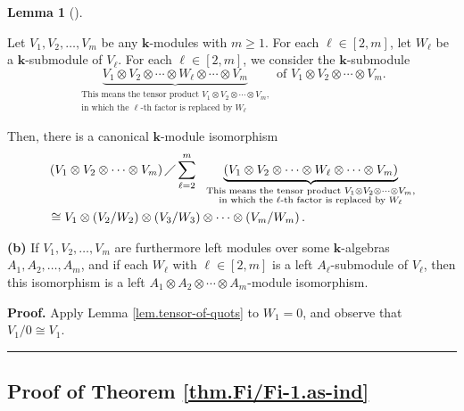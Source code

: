 \documentclass[numbers=enddot,12pt,final,onecolumn,notitlepage]{scrartcl}%
\theoremstyle{definition}
\newtheorem{lem}[theo]{Lemma}
\newenvironment{lemma}[1][]
{\begin{lem}[#1]\begin{leftbar}}
{\end{leftbar}\end{lem}}
\newenvironment{noncompile}{}{}
\newenvironment{proof}[1][Proof]{\noindent\textbf{#1.} }{\ \rule{0.5em}{0.5em}}
\let\sumnonlimits\sum
\renewcommand{\sum}{\sumnonlimits\limits}
\begin{document}
\begin{lemma}
\label{lem.tensor-of-quots2}Let $V_{1},V_{2},\ldots,V_{m}$ be any $\mathbf{k}%
$-modules with $m\geq1$. For each $\ell\in\left[  2,m\right]  $, let $W_{\ell
}$ be a $\mathbf{k}$-submodule of $V_{\ell}$. For each $\ell\in\left[
2,m\right]  $, we consider the $\mathbf{k}$-submodule
\[
\underbrace{V_{1}\otimes V_{2}\otimes\cdots\otimes W_{\ell}\otimes
\cdots\otimes V_{m}}_{\substack{\text{This means the tensor product }%
V_{1}\otimes V_{2}\otimes\cdots\otimes V_{m}\text{,}\\\text{in which the }%
\ell\text{-th factor is replaced by }W_{\ell}}}\text{ of }V_{1}\otimes
V_{2}\otimes\cdots\otimes V_{m}.
\]


Then, there is a canonical $\mathbf{k}$-module isomorphism%
\begin{align*}
&  \left(  V_{1}\otimes V_{2}\otimes\cdots\otimes V_{m}\right)  \diagup
\sum_{\ell=2}^{m}\ \ \underbrace{\left(  V_{1}\otimes V_{2}\otimes
\cdots\otimes W_{\ell}\otimes\cdots\otimes V_{m}\right)  }%
_{\substack{\text{This means the tensor product }V_{1}\otimes V_{2}%
\otimes\cdots\otimes V_{m}\text{,}\\\text{in which the }\ell\text{-th factor
is replaced by }W_{\ell}}}\\
&  \cong V_{1}\otimes\left(  V_{2}/W_{2}\right)  \otimes\left(  V_{3}%
/W_{3}\right)  \otimes\cdots\otimes\left(  V_{m}/W_{m}\right)  .
\end{align*}

\end{lemma}

\begin{noncompile}
\textbf{(b)} If $V_{1},V_{2},\ldots,V_{m}$ are furthermore left modules over
some $\mathbf{k}$-algebras $A_{1},A_{2},\ldots,A_{m}$, and if each $W_{\ell}$
with $\ell\in\left[  2,m\right]  $ is a left $A_{\ell}$-submodule of $V_{\ell
}$, then this isomorphism is a left $A_{1}\otimes A_{2}\otimes\cdots\otimes
A_{m}$-module isomorphism.
\end{noncompile}

\begin{proof}
Apply Lemma \ref{lem.tensor-of-quots} to $W_{1}=0$, and observe that
$V_{1}/0\cong V_{1}$.
\end{proof}

\subsection{Proof of Theorem \ref{thm.Fi/Fi-1.as-ind}}
\end{document}

